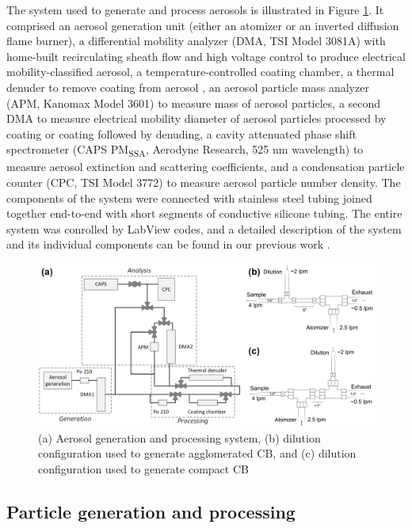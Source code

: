 

The system used to generate and process aerosols is illustrated in Figure \ref{fig:system}. It comprised an aerosol generation unit (either an atomizer or an inverted diffusion flame burner), a differential mobility analyzer (DMA, TSI Model 3081A) with home-built recirculating sheath flow and high voltage control to produce electrical mobility-classified aerosol, a temperature-controlled coating chamber, a thermal denuder to remove coating from aerosol \citep{RN39}, an aerosol particle mass analyzer (APM, Kanomax Model 3601) to measure mass of aerosol particles, a second DMA to measure electrical mobility diameter of aerosol particles processed by coating or coating followed by denuding, a cavity attenuated phase shift spectrometer (CAPS PM\textsubscript{SSA}, Aerodyne Research, 525 nm wavelength) to measure aerosol extinction and scattering coefficients, and a condensation particle counter (CPC, TSI Model 3772) to measure aerosol particle number density. The components of the system were connected with stainless steel tubing joined together end-to-end with short segments of conductive silicone tubing. The entire system was conrolled by LabView codes, and a detailed description of the system and its individual components can be found in our previous work \citep{RN48,RN49}.

\begin{figure}[ht]
\centering
\includegraphics[width=\textwidth]{system_diagram.png}
\caption{(a) Aerosol generation and processing system, (b) dilution configuration used to generate agglomerated CB, and (c) dilution configuration used to generate compact CB}
\label{fig:system}
\end{figure}

\subsection{Particle generation and processing}

